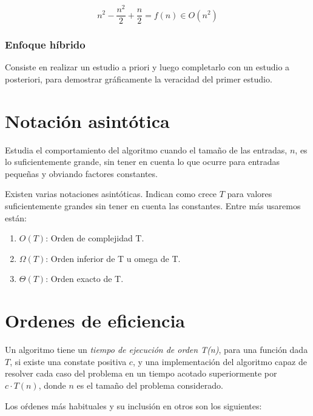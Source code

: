 \documentclass[10pt,a4paper,spanish]{report}
\theoremstyle{definition}
\theoremstyle{remark}
\begin{document}
    \begin{displaymath}
        n^{2} - \frac{n^{2}}{2} + \frac{n}{2} = f(n) \in O(n^2)
    \end{displaymath}

    \subsubsection{\textcolor{YellowOrange}Enfoque híbrido}

    Consiste en realizar un estudio a priori y luego completarlo con un estudio a posteriori, para demostrar gráficamente la veracidad del primer estudio.

    \section{\textcolor{YellowOrange}Notación asintótica}
    
    Estudia el comportamiento del algoritmo cuando el tamaño de las entradas, $n$, es lo suficientemente grande, sin tener en cuenta lo que ocurre para entradas pequeñas y obviando factores constantes.

    Existen varias notaciones asintóticas. Indican como crece $T$ para valores suficientemente grandes sin tener en cuenta las constantes. Entre más usaremos están:

    \begin{enumerate}[$\spadesuit$]
        \item $O(T)$: Orden de complejidad T.
        \item $\Omega(T)$: Orden inferior de T u omega de T.
        \item $\Theta(T)$: Orden exacto de T.
    \end{enumerate}
    
    \section{\textcolor{YellowOrange}Ordenes de eficiencia}

    Un algoritmo tiene un \textit{\textcolor{YellowOrange}{tiempo de ejecución de orden T(n)}}, para una función dada $T$, si existe una constate positiva $c$, y una implementación del algoritmo capaz de resolver cada caso del problema en un tiempo acotado superiormente por $c \cdot T(n)$, donde $n$ es el tamaño del problema considerado.

    Los oŕdenes más habituales y su inclusión en otros son los siguientes:
\end{document}
